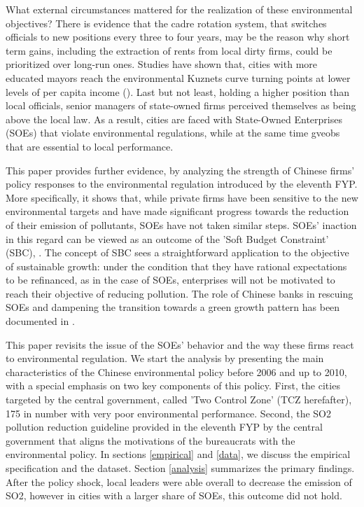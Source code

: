 \documentclass[12pt]{article}
\begin{document}
What external circumstances mattered for the realization of these environmental objectives? There is evidence that the cadre rotation system, that switches officials to new positions every three to four years, may be the reason why short term gains, including the extraction of rents from local dirty firms, could be prioritized over long-run ones. Studies have shown that, cities with more educated mayors reach the environmental Kuznets curve turning points at lower levels of per capita income (\cite{Zheng2014-ut}). Last but not least, holding a higher position than local officials, senior managers of state-owned firms perceived themselves as being above the local law. As a result, cities are faced with State-Owned Enterprises (SOEs) that violate environmental regulations, while at the same time gveobs that are essential to local performance. 


This paper provides further evidence, by analyzing the strength of Chinese firms' policy responses to the environmental regulation introduced by the eleventh FYP. More specifically, it shows that, while private firms have been sensitive to the new environmental targets and have made significant progress towards the reduction of their emission of pollutants, SOEs have not taken similar steps. SOEs' inaction in this regard can be viewed as an outcome of the 'Soft Budget Constraint' (SBC), \cite{Kornai2003-nv}. The concept of SBC sees a straightforward application to the objective of sustainable growth: under the condition that they have rational expectations to be refinanced, as in the case of SOEs, enterprises will not be motivated to reach their objective of reducing pollution. The role of Chinese banks in rescuing SOEs and dampening the transition towards a green growth pattern has been documented in \cite{Maurel2019-ap}. 


This paper revisits the issue of the SOEs' behavior and the way these firms react to environmental regulation. We start the analysis by presenting the main characteristics of the Chinese environmental policy before 2006 and up to 2010, with a special emphasis on two key components of this policy. First, the cities targeted by the central government, called 'Two Control Zone' (TCZ herefafter), 175 in number with very poor environmental performance. Second, the SO2 pollution reduction guideline provided in the eleventh FYP by the central government that aligns the motivations of the bureaucrats with the environmental policy. In sections \ref{empirical} and \ref{data}, we discuss the empirical specification and the dataset. Section \ref{analysis} summarizes the primary findings. After the policy shock, local leaders were able overall to decrease the emission of SO2, however in cities with a larger share of SOEs, this outcome did not hold. 
\end{document}
